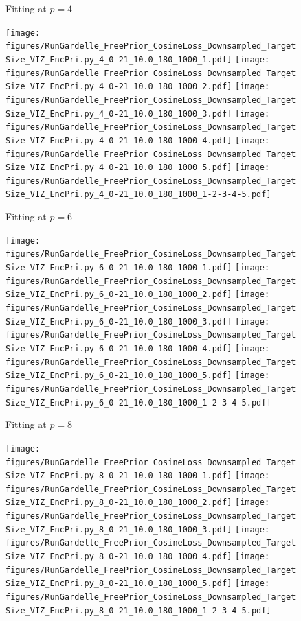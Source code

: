 \documentclass[si.tex]{subfiles}
\begin{document}
\begin{figure}
Fitting at $p=4$

\texttt{[image: figures/RunGardelle\_FreePrior\_CosineLoss\_Downsampled\_TargetSize\_VIZ\_EncPri.py\_4\_0-21\_10.0\_180\_1000\_1.pdf]}
\texttt{[image: figures/RunGardelle\_FreePrior\_CosineLoss\_Downsampled\_TargetSize\_VIZ\_EncPri.py\_4\_0-21\_10.0\_180\_1000\_2.pdf]}
\texttt{[image: figures/RunGardelle\_FreePrior\_CosineLoss\_Downsampled\_TargetSize\_VIZ\_EncPri.py\_4\_0-21\_10.0\_180\_1000\_3.pdf]}
\texttt{[image: figures/RunGardelle\_FreePrior\_CosineLoss\_Downsampled\_TargetSize\_VIZ\_EncPri.py\_4\_0-21\_10.0\_180\_1000\_4.pdf]}
\texttt{[image: figures/RunGardelle\_FreePrior\_CosineLoss\_Downsampled\_TargetSize\_VIZ\_EncPri.py\_4\_0-21\_10.0\_180\_1000\_5.pdf]}
\texttt{[image: figures/RunGardelle\_FreePrior\_CosineLoss\_Downsampled\_TargetSize\_VIZ\_EncPri.py\_4\_0-21\_10.0\_180\_1000\_1-2-3-4-5.pdf]}

Fitting at $p=6$

\texttt{[image: figures/RunGardelle\_FreePrior\_CosineLoss\_Downsampled\_TargetSize\_VIZ\_EncPri.py\_6\_0-21\_10.0\_180\_1000\_1.pdf]}
\texttt{[image: figures/RunGardelle\_FreePrior\_CosineLoss\_Downsampled\_TargetSize\_VIZ\_EncPri.py\_6\_0-21\_10.0\_180\_1000\_2.pdf]}
\texttt{[image: figures/RunGardelle\_FreePrior\_CosineLoss\_Downsampled\_TargetSize\_VIZ\_EncPri.py\_6\_0-21\_10.0\_180\_1000\_3.pdf]}
\texttt{[image: figures/RunGardelle\_FreePrior\_CosineLoss\_Downsampled\_TargetSize\_VIZ\_EncPri.py\_6\_0-21\_10.0\_180\_1000\_4.pdf]}
\texttt{[image: figures/RunGardelle\_FreePrior\_CosineLoss\_Downsampled\_TargetSize\_VIZ\_EncPri.py\_6\_0-21\_10.0\_180\_1000\_5.pdf]}
\texttt{[image: figures/RunGardelle\_FreePrior\_CosineLoss\_Downsampled\_TargetSize\_VIZ\_EncPri.py\_6\_0-21\_10.0\_180\_1000\_1-2-3-4-5.pdf]}

Fitting at $p=8$

\texttt{[image: figures/RunGardelle\_FreePrior\_CosineLoss\_Downsampled\_TargetSize\_VIZ\_EncPri.py\_8\_0-21\_10.0\_180\_1000\_1.pdf]}
\texttt{[image: figures/RunGardelle\_FreePrior\_CosineLoss\_Downsampled\_TargetSize\_VIZ\_EncPri.py\_8\_0-21\_10.0\_180\_1000\_2.pdf]}
\texttt{[image: figures/RunGardelle\_FreePrior\_CosineLoss\_Downsampled\_TargetSize\_VIZ\_EncPri.py\_8\_0-21\_10.0\_180\_1000\_3.pdf]}
\texttt{[image: figures/RunGardelle\_FreePrior\_CosineLoss\_Downsampled\_TargetSize\_VIZ\_EncPri.py\_8\_0-21\_10.0\_180\_1000\_4.pdf]}
\texttt{[image: figures/RunGardelle\_FreePrior\_CosineLoss\_Downsampled\_TargetSize\_VIZ\_EncPri.py\_8\_0-21\_10.0\_180\_1000\_5.pdf]}
\texttt{[image: figures/RunGardelle\_FreePrior\_CosineLoss\_Downsampled\_TargetSize\_VIZ\_EncPri.py\_8\_0-21\_10.0\_180\_1000\_1-2-3-4-5.pdf]}



\end{figure}
\end{document}
